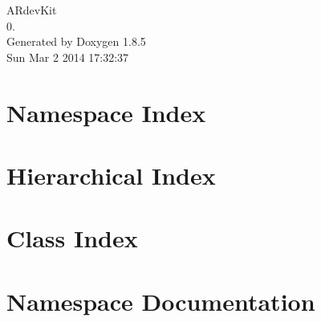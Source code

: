 \documentclass[twoside]{book}
\newcommand{\clearemptydoublepage}{%
  \newpage{\pagestyle{empty}\cleardoublepage}%
}
\begin{document}
\hypersetup{pageanchor=false}
\begin{titlepage}
\vspace*{7cm}
\begin{center}%
{\Large A\-Rdev\-Kit \\[1ex]\large 0. }\\
\vspace*{1cm}
{\large Generated by Doxygen 1.8.5}\\
\vspace*{0.5cm}
{\small Sun Mar 2 2014 17:32:37}\\
\end{center}
\end{titlepage}
\clearemptydoublepage
\tableofcontents
\clearemptydoublepage
{}
\hypersetup{pageanchor=true}

\chapter{Namespace Index}

\chapter{Hierarchical Index}

\chapter{Class Index}

\chapter{Namespace Documentation}














\end{document}
